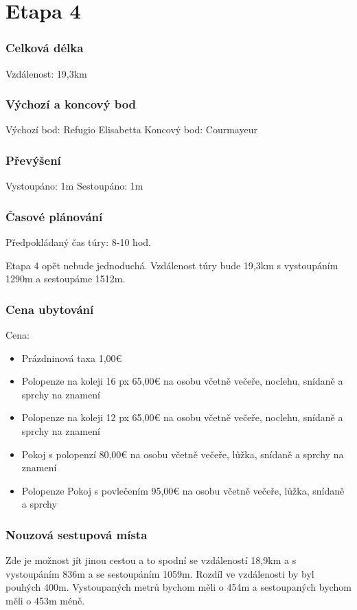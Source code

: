 \section{Etapa 4}
\subsubsection*{Celková délka}
\noindent Vzdálenost: 19,3\:km
\subsubsection*{Výchozí a koncový bod}
\noindent Výchozí bod: Refugio Elisabetta 
\noindent Koncový bod: Courmayeur
\subsubsection*{Převýšení}
\noindent Vystoupáno: 1\:m
\noindent Sestoupáno: 1\:m
\subsubsection*{Časové plánování}
\noindent Předpokládaný čas túry: 8-10 hod.

Etapa 4 opět nebude jednoduchá. Vzdálenost túry bude 19,3\:km s vystoupáním 1290\:m a sestoupáme 1512\:m.
\subsubsection*{Cena ubytování}
\noindent Cena:
\begin{itemize}
	\item Prázdninová taxa 1,00\:€
	\item Polopenze na koleji 16 px 65,00\:€ na osobu včetně večeře, noclehu, snídaně a sprchy na znamení
	\item Polopenze na koleji 12 px 65,00\:€ na osobu včetně večeře, noclehu, snídaně a sprchy na znamení
	\item Pokoj s polopenzí 80,00\:€ na osobu včetně večeře, lůžka, snídaně a sprchy na znamení
	\item Polopenze Pokoj s povlečením 95,00\:€ na osobu včetně večeře, lůžka, snídaně a sprchy
\end{itemize}
\subsubsection*{Nouzová sestupová místa}
Zde je možnost jít jinou cestou a to spodní se vzdáleností 18,9\:km a s vystoupáním 836\:m a se sestoupáním 1059\:m. Rozdíl ve vzdálenosti by byl pouhých 400\:m. Vystoupaných metrů bychom měli o 454\:m a sestoupaných bychom měli o 453\:m méně.
